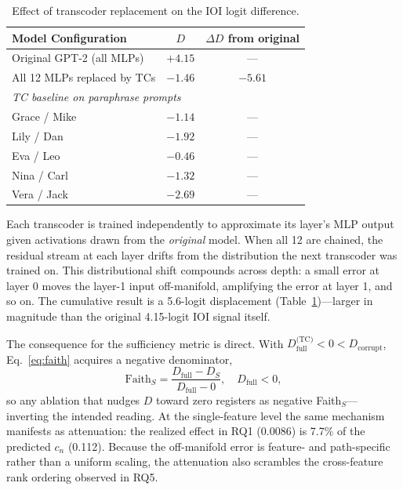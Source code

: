 \documentclass{article}
\begin{document}
\begin{table}[h]
\centering
\caption{Effect of transcoder replacement on the IOI logit difference.}
\label{tab:approx_error}
\begin{tabular}{lcc}
\toprule
Model Configuration & $D$ & $\Delta D$ from original \\
\midrule
Original GPT-2 (all MLPs)    & $+4.15$ & --- \\
All 12 MLPs replaced by TCs  & $-1.46$ & $-5.61$ \\
\midrule
\multicolumn{3}{l}{\textit{TC baseline on paraphrase prompts}} \\
\quad Grace / Mike & $-1.14$ & --- \\
\quad Lily / Dan   & $-1.92$ & --- \\
\quad Eva / Leo    & $-0.46$ & --- \\
\quad Nina / Carl  & $-1.32$ & --- \\
\quad Vera / Jack  & $-2.69$ & --- \\
\bottomrule
\end{tabular}
\end{table}

Each transcoder is trained independently to approximate its layer's MLP output
given activations drawn from the \emph{original} model. When all 12 are chained,
the residual stream at each layer drifts from the distribution the next
transcoder was trained on. This distributional shift compounds across depth: a
small error at layer 0 moves the layer-1 input off-manifold, amplifying the
error at layer 1, and so on. The cumulative result is a 5.6-logit displacement
(Table~\ref{tab:approx_error})---larger in magnitude than the original
4.15-logit IOI signal itself.

The consequence for the sufficiency metric is direct. With
$D_\text{full}^\text{(TC)} < 0 < D_\text{corrupt}$, Eq.~\ref{eq:faith} acquires
a negative denominator,
\begin{equation}
  \text{Faith}_S = \frac{D_\text{full} - D_S}{D_\text{full} - 0},
  \quad D_\text{full} < 0,
\end{equation}
so any ablation that nudges $D$ toward zero registers as negative Faith$_S$---
inverting the intended reading. At the single-feature level the same mechanism
manifests as attenuation: the realized effect in RQ1 (0.0086) is 7.7\% of the
predicted $c_n$ (0.112). Because the off-manifold error is feature- and
path-specific rather than a uniform scaling, the attenuation also scrambles the
cross-feature rank ordering observed in RQ5.
\end{document}

